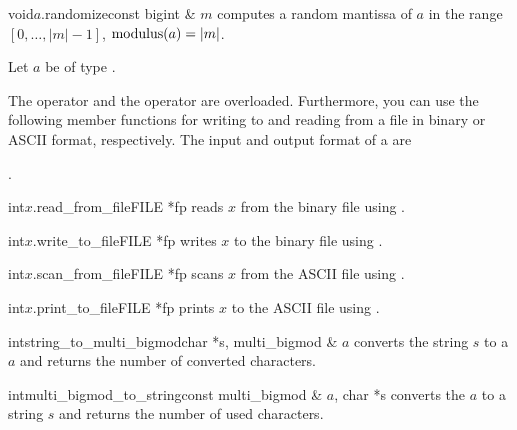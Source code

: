 \begin{fcode}{void}{$a$.randomize}{const bigint & $m$}
  computes a random mantissa of $a$ in the range $[0, \dots, |m|-1]$, $\operatorname{modulus}(a) = |m|$.
\end{fcode}



\IO

Let $a$ be of type .

The  operator \code{>>} and the  operator \code{<<} are
overloaded.  Furthermore, you can use the following member functions for writing to and reading
from a file in binary or ASCII format, respectively.  The input and output format of a
 are
\begin{center}
  .
\end{center}

\begin{fcode}{int}{$x$.read_from_file}{FILE *fp}
  reads $x$ from the binary file  using .
\end{fcode}

\begin{fcode}{int}{$x$.write_to_file}{FILE *fp}
  writes $x$ to the binary file  using .
\end{fcode}

\begin{fcode}{int}{$x$.scan_from_file}{FILE *fp}
  scans $x$ from the ASCII file  using .
\end{fcode}

\begin{fcode}{int}{$x$.print_to_file}{FILE *fp}
  prints $x$ to the ASCII file  using .
\end{fcode}

\begin{fcode}{int}{string_to_multi_bigmod}{char *s, multi_bigmod & $a$}
  converts the string $s$ to a  $a$ and returns the number of converted
  characters.
\end{fcode}

\begin{fcode}{int}{multi_bigmod_to_string}{const multi_bigmod & $a$, char *s}
  converts the  $a$ to a string $s$ and returns the number of used
  characters.
\end{fcode}




